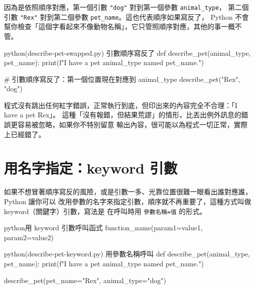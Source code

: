 
因為是依照順序對應，第一個引數 \texttt{"dog"} 對到第一個參數 \texttt{animal\_type}，
第二個引數 \texttt{"Rex"} 對到第二個參數 \texttt{pet\_name}。這也代表順序如果寫反了，
Python 不會幫你檢查「這個字看起來不像動物名稱」，它只管照順序對應，其他的事一概不管。

\begin{example}{python}{(describe-pet-swapped.py) 引數順序寫反了}
def describe_pet(animal_type, pet_name):
    print(f"I have a pet {animal_type} named {pet_name}.")


# 引數順序寫反了：第一個位置現在對應到 animal_type
describe_pet("Rex", "dog")
\end{example}


程式沒有跳出任何紅字錯誤，正常執行到底，但印出來的內容完全不合理：「I have a pet Rex」。
這種「沒有報錯，但結果荒謬」的情形，比丟出例外訊息的錯誤更容易被忽略，如果你不特別留意
輸出內容，很可能以為程式一切正常，實際上已經錯了。


\section{用名字指定：keyword 引數}
\label{sec:function-keyword}

如果不想冒著順序寫反的風險，或是引數一多、光靠位置很難一眼看出誰對應誰，Python 讓你可以
改用參數的名字來指定引數，順序就不再重要了，這種方式叫做 keyword（關鍵字）引數，寫法是
在呼叫時用 \texttt{參數名稱=值} 的形式。

\begin{code}{python}{用 keyword 引數呼叫函式}
function_name(param1=value1, param2=value2)
\end{code}

\begin{example}{python}{(describe-pet-keyword.py) 用參數名稱呼叫}
def describe_pet(animal_type, pet_name):
    print(f"I have a pet {animal_type} named {pet_name}.")


describe_pet(pet_name="Rex", animal_type="dog")
\end{example}

